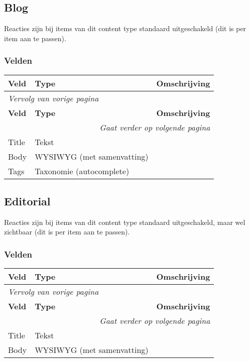 \subsection{Blog}
\label{sec:content-blog}
Reacties zijn bij items van dit content type standaard uitgeschakeld (dit is per item aan te passen).

\subsubsection{Velden}
  \begin{longtable}{| p{3.75cm}|p{3.75cm}|p{7.50cm}|}
  \hline
  \rowcolor{tableheader}
  \textbf{Veld} & \textbf{Type} & \textbf{Omschrijving}  \tabularnewline
  \hline
\endfirsthead
\multicolumn{3}{l}{\textit{Vervolg van vorige pagina}} \\
\hline
\rowcolor{tableheader}
  \textbf{Veld} & \textbf{Type} & \textbf{Omschrijving}  \tabularnewline
  \hline
\hline
\endhead
\multicolumn{3}{r}{\textit{Gaat verder op volgende pagina}} \\
\endfoot
\hline
\endlastfoot
  \raggedright{Title} & \raggedright{Tekst} & \raggedright{}  \tabularnewline
  \hline
  \raggedright{Body} & \raggedright{WYSIWYG (met samenvatting)} & \raggedright{}  \tabularnewline
  \hline
  \raggedright{Tags} & \raggedright{Taxonomie (autocomplete)} & \raggedright{}  \tabularnewline
  \hline
  \end{longtable}

\subsection{Editorial}
\label{sec:content-editorial}
Reacties zijn bij items van dit content type standaard uitgeschakeld, maar wel zichtbaar (dit is per item aan te passen).

\subsubsection{Velden}
  \begin{longtable}{| p{3.75cm}|p{3.75cm}|p{7.50cm}|}
  \hline
  \rowcolor{tableheader}
  \textbf{Veld} & \textbf{Type} & \textbf{Omschrijving}  \tabularnewline
  \hline
\endfirsthead
\multicolumn{3}{l}{\textit{Vervolg van vorige pagina}} \\
\hline
\rowcolor{tableheader}
  \textbf{Veld} & \textbf{Type} & \textbf{Omschrijving}  \tabularnewline
  \hline
\hline
\endhead
\multicolumn{3}{r}{\textit{Gaat verder op volgende pagina}} \\
\endfoot
\hline
\endlastfoot
  \raggedright{Title} & \raggedright{Tekst} & \raggedright{}  \tabularnewline
  \hline
  \raggedright{Body} & \raggedright{WYSIWYG (met samenvatting)} & \raggedright{}  \tabularnewline
  \hline
  \end{longtable}

